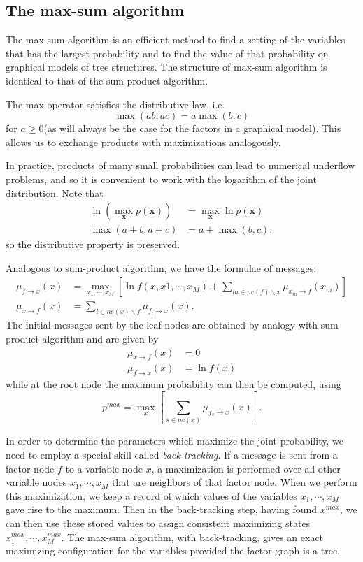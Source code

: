 \documentclass[a4paper]{book}
\renewcommand{\bf}{\mathbf}
\newcommand{\imp}[1]{\textit{#1}}
\begin{document}
\subsection{The max-sum algorithm}\label{MaxSum}
The max-sum algorithm is an efficient method to find a setting of the variables that has the largest probability and to find the value of that probability on graphical models of tree structures. The structure of max-sum algorithm is identical to that of the sum-product algorithm.

The max operator satisfies the distributive law, i.e.
\begin{equation}
	\max(ab,ac) = a \max(b,c)
\end{equation}
for $a\geq 0$(as will always be the case for the factors in a graphical model). This allows us to exchange products with maximizations analogously.

In practice, products of many small probabilities can lead to numerical underflow problems, and so it is convenient to work with the logarithm of the joint distribution. Note that
\begin{align}
	\ln(\max_{\bf{x}}p(\bf{x})) &= \max_{\bf{x}} \ln p(\bf{x})\\
	\max(a+b,a+c) &= a + \max(b,c),
\end{align}
so the distributive property is preserved.

Analogous to sum-product algorithm, we have the formulae of messages:
\begin{align}
	\mu_{f\rightarrow x}(x) &= \max_{x_1,\cdots,x_M}\left[\ln f(x,x1,\cdots,x_M)+\sum_{m \in ne(f)\backslash x} \mu_{x_m \rightarrow f}(x_m)\right]\\
	\mu_{x\rightarrow f}(x) &= \sum_{l \in ne(x)\backslash f}\mu_{f_l \rightarrow x}(x).
\end{align}
The initial messages sent by the leaf nodes are obtained by analogy with sum-product algorithm and are given by
\begin{align}
	\mu_{x \rightarrow f}(x) &= 0\\
	\mu_{f \rightarrow x}(x) &= \ln f(x)
\end{align}
while at the root node the maximum probability can then be computed, using
\begin{equation}
	p^{max} = \max_{x} \left[\sum_{s \in ne(x)}\mu_{f_s \rightarrow x}(x)\right].
\end{equation}

In order to determine the parameters which maximize the joint probability, we need to employ a special skill called \imp{back-tracking}. If a message is sent from a factor node $f$ to a variable node $x$, a maximization is performed over all other variable nodes $x_1,\cdots,x_M$ that are neighbors of that factor node. When we perform this maximization, we keep a record of which values of the variables $x_1,\cdots,x_M$ gave rise to the maximum. Then in the back-tracking step, having found $x^{max}$, we can then use these stored values to assign consistent maximizing states $x_1^{max},\cdots,x_M^{max}$. The max-sum algorithm, with back-tracking, gives an exact maximizing configuration for the variables provided the factor graph is a tree.
\end{document}
